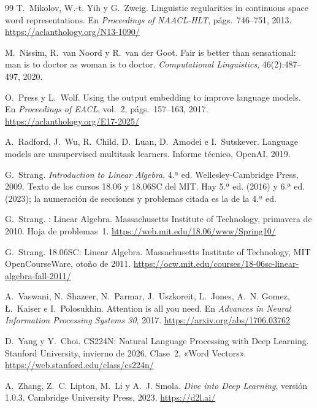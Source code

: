 \begin{thebibliography}{99}
T.~Mikolov, W.-t. Yih y G.~Zweig.
\newblock Linguistic regularities in continuous space word representations.
\newblock En \emph{Proceedings of NAACL-HLT}, págs.~746--751, 2013.
\newblock \url{https://aclanthology.org/N13-1090/}

M.~Nissim, R.~van Noord y R.~van der Goot.
\newblock Fair is better than sensational: man is to doctor as woman is to doctor.
\newblock \emph{Computational Linguistics}, 46(2):487--497, 2020.

O.~Press y L.~Wolf.
\newblock Using the output embedding to improve language models.
\newblock En \emph{Proceedings of EACL}, vol.~2, págs.~157--163, 2017.
\newblock \url{https://aclanthology.org/E17-2025/}

A.~Radford, J.~Wu, R.~Child, D.~Luan, D.~Amodei e I.~Sutskever.
\newblock Language models are unsupervised multitask learners.
\newblock Informe técnico, OpenAI, 2019.

G.~Strang.
\newblock \emph{Introduction to Linear Algebra}, 4.ª ed.
\newblock Wellesley-Cambridge Press, 2009.
\newblock Texto de los cursos 18.06 y 18.06SC del MIT. Hay 5.ª ed. (2016) y 6.ª ed. (2023); la numeración de secciones y problemas citada es la de la 4.ª ed.

G.~Strang.
: Linear Algebra.
\newblock Massachusetts Institute of Technology, primavera de 2010. Hoja de problemas~1.
\newblock \url{https://web.mit.edu/18.06/www/Spring10/}

G.~Strang.
\newblock 18.06SC: Linear Algebra.
\newblock Massachusetts Institute of Technology, MIT OpenCourseWare, otoño de 2011.
\newblock \url{https://ocw.mit.edu/courses/18-06sc-linear-algebra-fall-2011/}

A.~Vaswani, N.~Shazeer, N.~Parmar, J.~Uszkoreit, L.~Jones, A.~N. Gomez, Ł.~Kaiser e I.~Polosukhin.
\newblock Attention is all you need.
\newblock En \emph{Advances in Neural Information Processing Systems 30}, 2017.
\newblock \url{https://arxiv.org/abs/1706.03762}

D.~Yang y Y.~Choi.
\newblock CS224N: Natural Language Processing with Deep Learning.
\newblock Stanford University, invierno de 2026. Clase~2, «Word Vectors».
\newblock \url{https://web.stanford.edu/class/cs224n/}

A.~Zhang, Z.~C. Lipton, M.~Li y A.~J. Smola.
\newblock \emph{Dive into Deep Learning}, versión 1.0.3.
\newblock Cambridge University Press, 2023.
\newblock \url{https://d2l.ai/}

\end{thebibliography}
